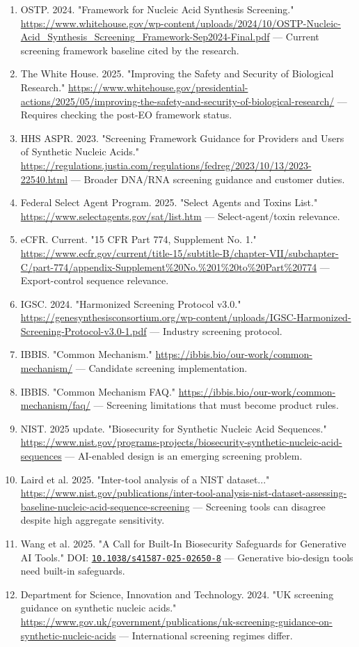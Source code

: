 \documentclass[11pt]{report}
\begin{document}
\begin{enumerate}
\item OSTP. 2024. "Framework for Nucleic Acid Synthesis Screening." \url{https://www.whitehouse.gov/wp-content/uploads/2024/10/OSTP-Nucleic-Acid_Synthesis_Screening_Framework-Sep2024-Final.pdf} — Current screening framework baseline cited by the research.
\item The White House. 2025. "Improving the Safety and Security of Biological Research." \url{https://www.whitehouse.gov/presidential-actions/2025/05/improving-the-safety-and-security-of-biological-research/} — Requires checking the post-EO framework status.
\item HHS ASPR. 2023. "Screening Framework Guidance for Providers and Users of Synthetic Nucleic Acids." \url{https://regulations.justia.com/regulations/fedreg/2023/10/13/2023-22540.html} — Broader DNA/RNA screening guidance and customer duties.
\item Federal Select Agent Program. 2025. "Select Agents and Toxins List." \url{https://www.selectagents.gov/sat/list.htm} — Select-agent/toxin relevance.
\item eCFR. Current. "15 CFR Part 774, Supplement No. 1." \url{https://www.ecfr.gov/current/title-15/subtitle-B/chapter-VII/subchapter-C/part-774/appendix-Supplement\%20No.\%201\%20to\%20Part\%20774} — Export-control sequence relevance.
\item IGSC. 2024. "Harmonized Screening Protocol v3.0." \url{https://genesynthesisconsortium.org/wp-content/uploads/IGSC-Harmonized-Screening-Protocol-v3.0-1.pdf} — Industry screening protocol.
\item IBBIS. "Common Mechanism." \url{https://ibbis.bio/our-work/common-mechanism/} — Candidate screening implementation.
\item IBBIS. "Common Mechanism FAQ." \url{https://ibbis.bio/our-work/common-mechanism/faq/} — Screening limitations that must become product rules.
\item NIST. 2025 update. "Biosecurity for Synthetic Nucleic Acid Sequences." \url{https://www.nist.gov/programs-projects/biosecurity-synthetic-nucleic-acid-sequences} — AI-enabled design is an emerging screening problem.
\item Laird et al. 2025. "Inter-tool analysis of a NIST dataset..." \url{https://www.nist.gov/publications/inter-tool-analysis-nist-dataset-assessing-baseline-nucleic-acid-sequence-screening} — Screening tools can disagree despite high aggregate sensitivity.
\item Wang et al. 2025. "A Call for Built-In Biosecurity Safeguards for Generative AI Tools." DOI: \href{https://doi.org/10.1038/s41587-025-02650-8}{\nolinkurl{10.1038/s41587-025-02650-8}} — Generative bio-design tools need built-in safeguards.
\item Department for Science, Innovation and Technology. 2024. "UK screening guidance on synthetic nucleic acids." \url{https://www.gov.uk/government/publications/uk-screening-guidance-on-synthetic-nucleic-acids} — International screening regimes differ.
\end{enumerate}
\end{document}
